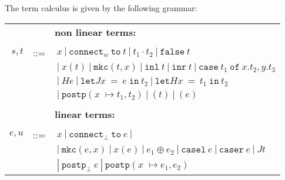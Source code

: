 The term calculus is given by the following grammar: 
\begin{center}

\begin{tabular}{rcl}
&&{\bf non linear terms:}\\
\\
$s, t$ & \quad ::=\quad &$\ x\ |\  \mathtt{connect}_w\ \mathtt{to}\  t\ |\  t_1\cdot t_2\ |\  \mathtt{false}\  t\ $\\
&& $\ |\ x(t)\ |\ \mathtt{mkc}(t, x)\ |\  \mathtt{inl}\ t\ |\ \mathtt{inr}\ t \ |\  \mathtt{case}\ t_1\ \mathtt{of}\ x.t_2 , y.t_3$\\
&& $\ |\ He\ |\  \mathtt{let}J x\ =\ e\ \mathtt{in}\ t_2\ |\ \mathtt{let} H x\ =\ t_1\ \mathtt{in}\ t_2$\\
&& $\ |\ \mathtt{postp} (x 􏰀\mapsto t_1, t_2)\ |\ (t) \ |\ (e) $ \\
\\
&&{\bf linear terms:}\\
\\
$e, u$ &\quad::=\quad & $ \ x\ |\  \mathtt{connect}_{\bot}\ \mathtt{to}\ e\ |$ \\
&& $\ |\  \mathtt{mkc}(e, x)\ |\  x(e)\ |\  e_1\oplus e_2\ |\ \mathtt{casel}\ e\ |\  \mathtt{caser}\ e\ |\ Jt$ \\
&& $\ |\  \mathtt{postp}_{\bot}\ e\ |\ \mathtt{postp} (x 􏰀\mapsto e_1, e_2)$\\
\end{tabular}
\end{center}
